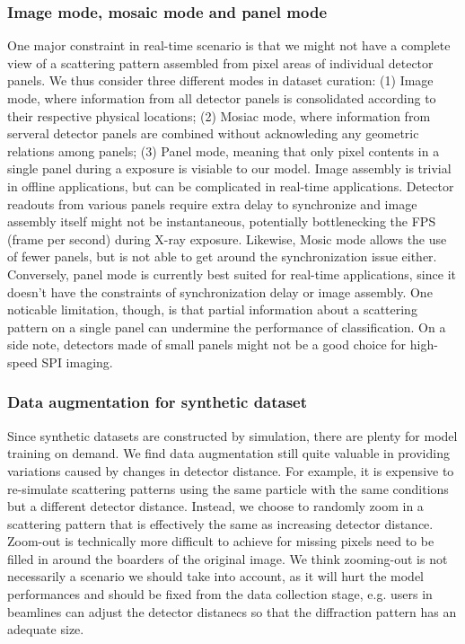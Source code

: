 \subsubsection{Image mode, mosaic mode and panel mode}

One major constraint in real-time scenario is that we might not have a complete
view of a scattering pattern assembled from pixel areas of individual detector
panels.  We thus consider three different modes in dataset curation: (1) Image
mode, where information from all detector panels is consolidated according to
their respective physical locations; (2) Mosiac mode, where information from
serveral detector panels are combined without acknowleding any geometric
relations among panels;  (3) Panel mode, meaning that only pixel contents in a
single panel during a exposure is visiable to our model.  Image assembly is
trivial in offline applications, but can be complicated in real-time
applications.  Detector readouts from various panels require extra delay to
synchronize and image assembly itself might not be instantaneous, potentially
bottlenecking the FPS (frame per second) during X-ray exposure. Likewise, Mosic
mode allows the use of fewer panels, but is not able to get around the
synchronization issue either.  Conversely, panel mode is currently best suited
for real-time applications, since it doesn't have the constraints of
synchronization delay or image assembly.  One noticable limitation, though, is
that partial information about a scattering pattern on a single panel can
undermine the performance of classification.  On a side note, detectors made of
small panels might not be a good choice for high-speed SPI imaging.  


\subsubsection{Data augmentation for synthetic dataset}


Since synthetic datasets are constructed by simulation, there are plenty for
model training on demand.  We find data augmentation still quite valuable in
providing variations caused by changes in detector distance.  For example, it is
expensive to re-simulate scattering patterns using the same particle with the
same conditions but a different detector distance.  Instead, we choose to
randomly zoom in a scattering pattern that is effectively the same as increasing
detector distance.  Zoom-out is technically more difficult to achieve for
missing pixels need to be filled in around the boarders of the original image.
We think zooming-out is not necessarily a scenario we should take into account,
as it will hurt the model performances and should be fixed from the data
collection stage, e.g. users in beamlines can adjust the detector distanecs so
that the diffraction pattern has an adequate size.  


